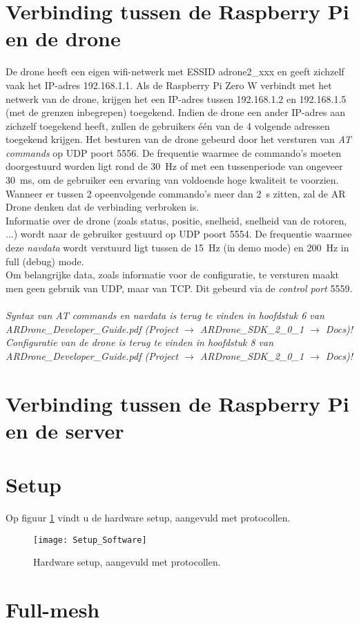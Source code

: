\section{Verbinding tussen de Raspberry Pi en de drone} \label{sec:raspberry_drone}
De drone heeft een eigen wifi-netwerk met ESSID adrone2\_xxx en geeft zichzelf vaak het IP-adres 192.168.1.1.
Als de Raspberry Pi Zero W verbindt met het netwerk van de drone, krijgen het een IP-adres tussen 192.168.1.2 en 192.168.1.5 (met de grenzen inbegrepen) toegekend.
Indien de drone een ander IP-adres aan zichzelf toegekend heeft, zullen de gebruikers één van de 4 volgende adressen toegekend krijgen.
Het besturen van de drone gebeurd door het versturen van \textit{AT commands} op UDP poort 5556.
De frequentie waarmee de commando's moeten doorgestuurd worden ligt rond de \SI{30}{\Hz} of met een tussenperiode van ongeveer \SI{30}{\ms}, om de gebruiker een ervaring van voldoende hoge kwaliteit te voorzien.
Wanneer er tussen 2 opeenvolgende commando's meer dan \SI{2}{\s} zitten, zal de AR Drone denken dat de verbinding verbroken is.\\
Informatie over de drone (zoals status, positie, snelheid, snelheid van de rotoren, ...) wordt naar de gebruiker gestuurd op UDP poort 5554.
De frequentie waarmee deze \textit{navdata} wordt verstuurd ligt tussen de \SI{15}{\Hz} (in demo mode) en \SI{200}{\Hz} in full (debug) mode.\\
Om belangrijke data, zoals informatie voor de configuratie, te versturen maakt men geen gebruik van UDP, maar van TCP.
Dit gebeurd via de \textit{control port} 5559. \cite{developer_guide2012}\\
\\
\textit{Syntax van AT commands en navdata is terug te vinden in hoofdstuk 6 van ARDrone\_Developer\_Guide.pdf (Project $\to$ ARDrone\_SDK\_2\_0\_1 $\to$ Docs)!}\\
\textit{Configuratie van de drone is terug te vinden in hoofdstuk 8 van ARDrone\_Developer\_Guide.pdf (Project $\to$ ARDrone\_SDK\_2\_0\_1 $\to$ Docs)!}

\section{Verbinding tussen de Raspberry Pi en de server} \label{sec:raspberry_server}

\section{Setup} \label{sec:setup_software}
Op figuur \ref{fig:setup_software} vindt u de hardware setup, aangevuld met protocollen.
\begin{figure}[p]
	\centering
	\texttt{[image: Setup\_Software]}
	\caption[Hardware setup, aangevuld met protocollen]{Hardware setup, aangevuld met protocollen.}
	\label{fig:setup_software}
\end{figure}

\section{Full-mesh} \label{sec:full_mesh}
